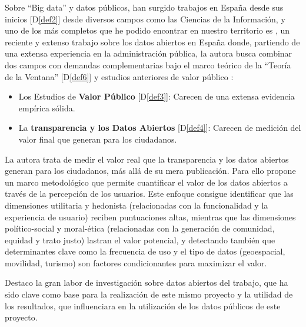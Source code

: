 	Sobre ``Big data'' y datos públicos, han surgido trabajos en España desde sus inicios \citep{OperGovernment2011} [D\ref{def2}] desde diversos campos como las Ciencias de la Información, y uno de los más completos que he podido encontrar en nuestro territorio es \citep{HerreraCapriz2024}, un reciente y extenso trabajo sobre los datos abiertos en España donde, partiendo de una extensa experiencia en la administración pública, la autora busca combinar dos campos con demandas complementarias bajo el marco teórico de la ``Teoría de la Ventana'' [D\ref{def6}] y estudios anteriores de valor público \citep{Meynhardt19032009}:
	\begin{itemize}
		\item Los Estudios de \textbf{Valor Público} [D\ref{def3}]: Carecen de una extensa evidencia empírica sólida.
		\item La \textbf{transparencia y los Datos Abiertos} [D\ref{def4}]: Carecen de medición del valor final que generan para los ciudadanos.
	\end{itemize}
	
	La autora trata de medir el valor real que la transparencia y los datos abiertos generan para los ciudadanos, más allá de su mera publicación. Para ello propone un marco metodológico que permite cuantificar el valor de los datos abiertos a través de la percepción de los usuarios. Este enfoque consigue identificar que las dimensiones utilitaria y hedonista (relacionadas con la funcionalidad y la experiencia de usuario) reciben puntuaciones altas, mientras que las dimensiones político-social y moral-ética (relacionadas con la generación de comunidad, equidad y trato justo) lastran el valor potencial, y detectando también que determinantes clave como la frecuencia de uso y el tipo de datos (geoespacial, movilidad, turismo) son factores condicionantes para maximizar el valor.
	
	Destaco la gran labor de investigación sobre datos abiertos del trabajo, que ha sido clave como base para la realización de este mismo proyecto y la utilidad de los resultados, que influenciara en la utilización de los datos públicos de este proyecto.
	
